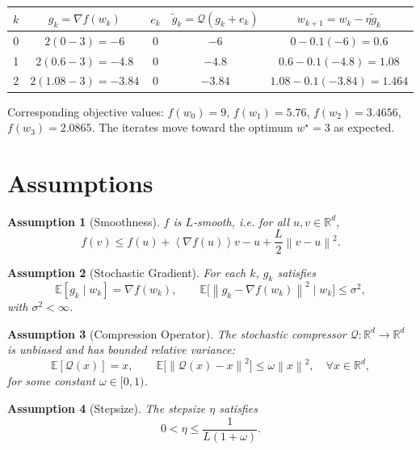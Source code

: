 \documentclass{article}
\newtheorem{assumption}{Assumption}
\newcommand{\E}{\mathbb{E}}
\newcommand{\R}{\mathbb{R}}
\newcommand{\norm}[1]{\left\lVert #1\right\rVert}
\newcommand{\inner}[1]{\left\langle #1\right\rangle}
\newcommand{\Q}{\mathcal{Q}}
\begin{document}
\begin{center}
\begin{tabular}{c|c|c|c|c}
$k$ & $g_k= \nabla f(w_k)$ & $e_k$ & $\tilde g_k=\Q(g_k+e_k)$ & $w_{k+1}=w_k-\eta\tilde g_k$\\ \hline
0 & $2(0-3)=-6$ & $0$ & $-6$ & $0-0.1(-6)=0.6$\\
1 & $2(0.6-3)=-4.8$ & $0$ & $-4.8$ & $0.6-0.1(-4.8)=1.08$\\
2 & $2(1.08-3)=-3.84$ & $0$ & $-3.84$ & $1.08-0.1(-3.84)=1.464$\\
\end{tabular}
\end{center}
Corresponding objective values:
$f(w_0)=9$, $f(w_1)=5.76$, $f(w_2)=3.4656$, $f(w_3)=2.0865$.
The iterates move toward the optimum $w^\star=3$ as expected.

\newpage
\section*{Assumptions}
\begin{assumption}[Smoothness]\label{as:smooth}
$f$ is $L$‑smooth, i.e. for all $u,v\in\R^{d}$,
\[
    f(v)\le f(u)+\inner{\nabla f(u)}{v-u}+\frac{L}{2}\norm{v-u}^{2}.
\]
\end{assumption}
\begin{assumption}[Stochastic Gradient]\label{as:sg}
For each $k$, $g_k$ satisfies
\[
    \E[g_k\mid w_k]=\nabla f(w_k),\qquad
    \E\!\big[\norm{g_k-\nabla f(w_k)}^{2}\mid w_k\big]\le\sigma^{2},
\]
with $\sigma^{2}<\infty$.
\end{assumption}
\begin{assumption}[Compression Operator]\label{as:comp}
The stochastic compressor $\Q:\R^{d}\rightarrow\R^{d}$ is unbiased and has
bounded relative variance:
\[
    \E[\Q(x)]=x,\qquad
    \E\!\big[\norm{\Q(x)-x}^{2}\big]\le\omega\norm{x}^{2},\quad\forall x\in\R^{d},
\]
for some constant $\omega\in[0,1)$.
\end{assumption}
\begin{assumption}[Stepsize]\label{as:step}
The stepsize $\eta$ satisfies
\[
    0<\eta\le\frac{1}{L(1+\omega)}.
\]
\end{assumption}
\end{document}
